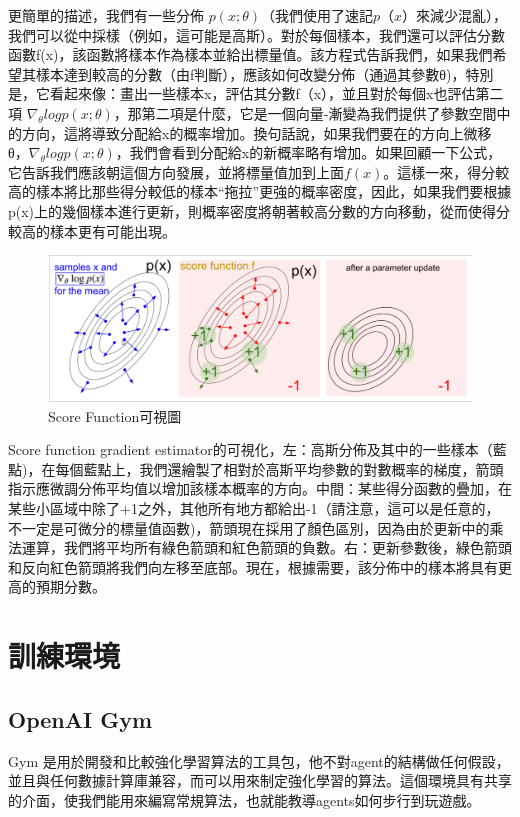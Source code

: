 \documentclass[14pt,a4paper]{report}  %
\begin{document}
更簡單的描述，我們有一些分佈 $p(x;\theta)$（我們使用了速記$ p（x）$來減少混亂），我們可以從中採樣（例如，這可能是高斯）。對於每個樣本，我們還可以評估分數函數f(x)，該函數將樣本作為樣本並給出標量值。該方程式告訴我們，如果我們希望其樣本達到較高的分數（由f判斷），應該如何改變分佈（通過其參數θ)，特別是，它看起來像：畫出一些樣本x，評估其分數f（x），並且對於每個x也評估第二項 $\nabla_\theta logp(x;θ)$，那第二項是什麼，它是一個向量-漸變為我們提供了參數空間中的方向，這將導致分配給x的概率增加。換句話說，如果我們要在的方向上微移θ，$\nabla_\theta logp(x;θ)$，我們會看到分配給x的新概率略有增加。如果回顧一下公式，它告訴我們應該朝這個方向發展，並將標量值加到上面$f(x)$。這樣一來，得分較高的樣本將比那些得分較低的樣本“拖拉”更強的概率密度，因此，如果我們要根據p(x)上的幾個樣本進行更新，則概率密度將朝著較高分數的方向移動，從而使得分較高的樣本更有可能出現。\\
\begin{figure}[hbt!]
\begin{center}
\includegraphics[scale=0.4]{figure}
\caption{Score Function可視圖}
\end{center}
\end{figure}

 Score function gradient estimator的可視化，左：高斯分佈及其中的一些樣本（藍點)，在每個藍點上，我們還繪製了相對於高斯平均參數的對數概率的梯度，箭頭指示應微調分佈平均值以增加該樣本概率的方向。中間：某些得分函數的疊加，在某些小區域中除了+1之外，其他所有地方都給出-1（請注意，這可以是任意的，不一定是可微分的標量值函數)，箭頭現在採用了顏色區別，因為由於更新中的乘法運算，我們將平均所有綠色箭頭和紅色箭頭的負數。右：更新參數後，綠色箭頭和反向紅色箭頭將我們向左移至底部。現在，根據需要，該分佈中的樣本將具有更高的預期分數。\\
\newpage
\chapter{訓練環境}
\section{OpenAI Gym}
 Gym 是用於開發和比較強化學習算法的工具包，他不對agent的結構做任何假設，並且與任何數據計算庫兼容，而可以用來制定強化學習的算法。這個環境具有共享的介面，使我們能用來編寫常規算法，也就能教導agents如何步行到玩遊戲。\\[6pt]
\end{document}
